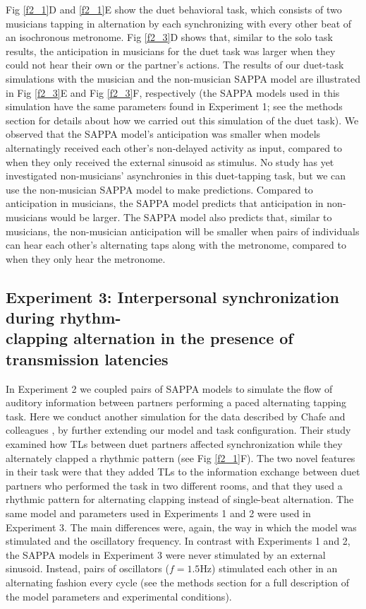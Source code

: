 \documentclass{report}
\begin{document}
Fig \ref{f2_1}D and \ref{f2_1}E show the duet behavioral task, which consists of two musicians tapping in alternation by each synchronizing with every other beat of an isochronous metronome. Fig \ref{f2_3}D shows that, similar to the solo task results, the anticipation in musicians for the duet task was larger when they could not hear their own or the partner’s actions. The results of our duet-task simulations with the musician and the non-musician SAPPA model are illustrated in Fig \ref{f2_3}E and Fig \ref{f2_3}F, respectively (the SAPPA models used in this simulation have the same parameters found in Experiment 1; see the methods section for details about how we carried out this simulation of the duet task). We observed that the SAPPA model’s anticipation was smaller when models alternatingly received each other’s non-delayed activity as input, compared to when they only received the external sinusoid as stimulus. No study has yet investigated non-musicians’ asynchronies in this duet-tapping task, but we can use the non-musician SAPPA model to make predictions. Compared to anticipation in musicians, the SAPPA model predicts that anticipation in non-musicians would be larger. The SAPPA model also predicts that, similar to musicians, the non-musician anticipation will be smaller when pairs of individuals can hear each other’s alternating taps along with the metronome, compared to when they only hear the metronome.

\subsection{Experiment 3: Interpersonal synchronization during rhythm-\\ clapping alternation in the presence of transmission latencies}

In Experiment 2 we coupled pairs of SAPPA models to simulate the flow of auditory information between partners performing a paced alternating tapping task. Here we conduct another simulation for the data described by Chafe and colleagues \cite{chafe2010effect}, by further extending our model and task configuration. Their study examined how TLs between duet partners affected synchronization while they alternately clapped a rhythmic pattern (see Fig \ref{f2_1}F). The two novel features in their task were that they added TLs to the information exchange between duet partners who performed the task in two different rooms, and that they used a rhythmic pattern for alternating clapping instead of single-beat alternation. The same model and parameters used in Experiments 1 and 2 were used in Experiment 3. The main differences were, again, the way in which the model was stimulated and the oscillatory frequency. In contrast with Experiments 1 and 2, the SAPPA models in Experiment 3 were never stimulated by an external sinusoid. Instead, pairs of oscillators ($f = 1.5$Hz) stimulated each other in an alternating fashion every cycle (see the methods section for a full description of the model parameters and experimental conditions).
\end{document}
